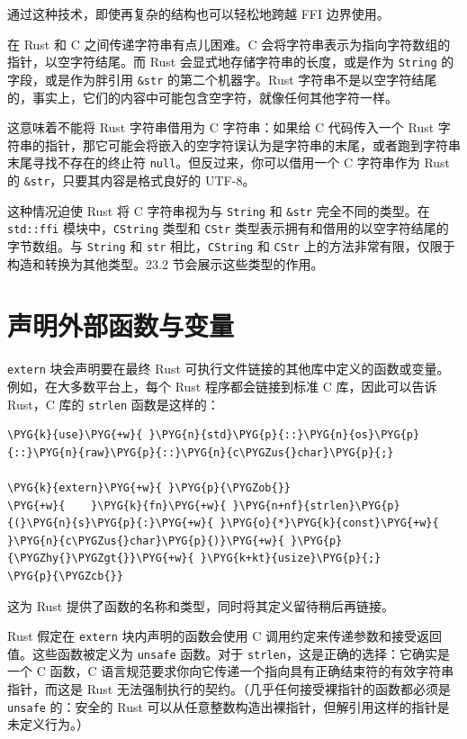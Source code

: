 通过这种技术，即使再复杂的结构也可以轻松地跨越 FFI 边界使用。

在 Rust 和 C 之间传递字符串有点儿困难。C 会将字符串表示为指向字符数组的指针，以空字符结尾。而 Rust 会显式地存储字符串的长度，或是作为 \texttt{String} 的字段，或是作为胖引用 \texttt{\&str} 的第二个机器字。Rust 字符串不是以空字符结尾的，事实上，它们的内容中可能包含空字符，就像任何其他字符一样。

这意味着不能将 Rust 字符串借用为 C 字符串：如果给 C 代码传入一个 Rust 字符串的指针，那它可能会将嵌入的空字符误认为是字符串的末尾，或者跑到字符串末尾寻找不存在的终止符 \texttt{null}。但反过来，你可以借用一个 C 字符串作为 Rust 的 \texttt{\&str}，只要其内容是格式良好的 UTF-8。

这种情况迫使 Rust 将 C 字符串视为与 \texttt{String} 和 \texttt{\&str} 完全不同的类型。在 \texttt{std::ffi} 模块中，\texttt{CString} 类型和 \texttt{CStr} 类型表示拥有和借用的以空字符结尾的字节数组。与 \texttt{String} 和 \texttt{str} 相比，\texttt{CString} 和 \texttt{CStr} 上的方法非常有限，仅限于构造和转换为其他类型。23.2 节会展示这些类型的作用。

\section{声明外部函数与变量}

\texttt{extern} 块会声明要在最终 Rust 可执行文件链接的其他库中定义的函数或变量。例如，在大多数平台上，每个 Rust 程序都会链接到标准 C 库，因此可以告诉 Rust，C 库的 \texttt{strlen} 函数是这样的：

\begin{Verbatim}[commandchars=\\\{\},breaklines=true,breakanywhere=true,fontsize=\codefont,xleftmargin=17bp]
\PYG{k}{use}\PYG{+w}{ }\PYG{n}{std}\PYG{p}{::}\PYG{n}{os}\PYG{p}{::}\PYG{n}{raw}\PYG{p}{::}\PYG{n}{c\PYGZus{}char}\PYG{p}{;}

\PYG{k}{extern}\PYG{+w}{ }\PYG{p}{\PYGZob{}}
\PYG{+w}{    }\PYG{k}{fn}\PYG{+w}{ }\PYG{n+nf}{strlen}\PYG{p}{(}\PYG{n}{s}\PYG{p}{:}\PYG{+w}{ }\PYG{o}{*}\PYG{k}{const}\PYG{+w}{ }\PYG{n}{c\PYGZus{}char}\PYG{p}{)}\PYG{+w}{ }\PYG{p}{\PYGZhy{}\PYGZgt{}}\PYG{+w}{ }\PYG{k+kt}{usize}\PYG{p}{;}
\PYG{p}{\PYGZcb{}}
\end{Verbatim}

这为 Rust 提供了函数的名称和类型，同时将其定义留待稍后再链接。

Rust 假定在 \texttt{extern} 块内声明的函数会使用 C 调用约定来传递参数和接受返回值。这些函数被定义为 \texttt{unsafe} 函数。对于 \texttt{strlen}，这是正确的选择：它确实是一个 C 函数，C 语言规范要求你向它传递一个指向具有正确结束符的有效字符串指针，而这是 Rust 无法强制执行的契约。（几乎任何接受裸指针的函数都必须是 \texttt{unsafe} 的：安全的 Rust 可以从任意整数构造出裸指针，但解引用这样的指针是未定义行为。）

